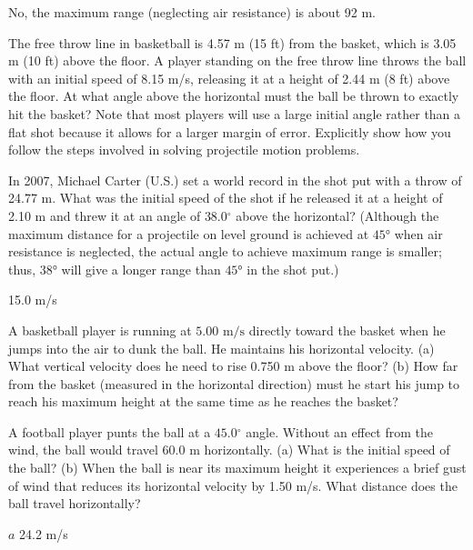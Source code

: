 \documentclass[
]{book}
\newenvironment{problems-exercises}{}{}
\begin{document}
\begin{problems-exercises}
\leavevmode\hypertarget{fs-id1985242}{}%
No, the maximum range (neglecting air resistance) is about 92 m.

\hypertarget{fs-id1437858}{}
\leavevmode\hypertarget{fs-id1891285}{}%
The free throw line in basketball is 4.57 m (15 ft) from the basket,
which is 3.05 m (10 ft) above the floor. A player standing on the free
throw line throws the ball with an initial speed of 8.15 m/s, releasing
it at a height of 2.44 m (8 ft) above the floor. At what angle above the
horizontal must the ball be thrown to exactly hit the basket? Note that
most players will use a large initial angle rather than a flat shot
because it allows for a larger margin of error. Explicitly show how you
follow the steps involved in solving projectile motion problems.

\hypertarget{fs-id1827481}{}
\leavevmode\hypertarget{fs-id1750926}{}%
In 2007, Michael Carter (U.S.) set a world record in the shot put with a
throw of 24.77 m. What was the initial speed of the shot if he released
it at a height of 2.10 m and threw it at an angle of \(38.0{^\circ}{}\)
above the horizontal? (Although the maximum distance for a projectile on
level ground is achieved at \(\text{45°}{}\) when air resistance is
neglected, the actual angle to achieve maximum range is smaller; thus,
\(\text{38°}{}\) will give a longer range than \(\text{45°}{}\) in the shot
put.)

\leavevmode\hypertarget{fs-id1630701}{}%
15.0 m/s

\hypertarget{fs-id1670278}{}
\leavevmode\hypertarget{fs-id1945400}{}%
A basketball player is running at \({5\text{.}\text{00~m/s}}{}\) directly
toward the basket when he jumps into the air to dunk the ball. He
maintains his horizontal velocity. (a) What vertical velocity does he
need to rise 0.750 m above the floor? (b) How far from the basket
(measured in the horizontal direction) must he start his jump to reach
his maximum height at the same time as he reaches the basket?

\hypertarget{fs-id1779635}{}
\leavevmode\hypertarget{fs-id1637691}{}%
A football player punts the ball at a \(45.0{^\circ}{}\) angle. Without an
effect from the wind, the ball would travel 60.0 m horizontally. (a)
What is the initial speed of the ball? (b) When the ball is near its
maximum height it experiences a brief gust of wind that reduces its
horizontal velocity by 1.50 m/s. What distance does the ball travel
horizontally?

\leavevmode\hypertarget{fs-id1545352}{}%
\(a\) 24.2 m/s


\end{problems-exercises}
\end{document}
